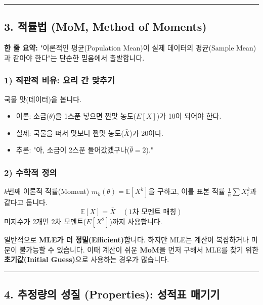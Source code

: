 \documentclass[11pt,a4paper]{book}
\theoremstyle{definition}
\begin{document}
\vspace{0.5cm}\hrule\vspace{0.5cm}

\subsection{3. 적률법 (MoM, Method of Moments)}

\begin{conceptbox}[title={개념 3: 평균을 평균에 맞춘다}]
\textbf{한 줄 요약:} "이론적인 평균(Population Mean)이 실제 데이터의 평균(Sample Mean)과 같아야 한다"는 단순한 믿음에서 출발합니다.
\end{conceptbox}

\subsubsection*{1) 직관적 비유: 요리 간 맞추기}
국물 맛(데이터)을 봅니다.
\begin{itemize}
    \item 이론: 소금($\theta$)을 1스푼 넣으면 짠맛 농도($E[X]$)가 10이 되어야 한다.
    \item 실제: 국물을 떠서 맛보니 짠맛 농도($\bar{X}$)가 20이다.
    \item 추론: "아, 소금이 2스푼 들어갔겠구나($\hat{\theta}=2$)."
\end{itemize}

\subsubsection*{2) 수학적 정의}
$k$번째 이론적 적률(Moment) $m_k(\theta) = \mathbb{E}[X^k]$을 구하고, 이를 표본 적률 $\frac{1}{n}\sum X_i^k$과 같다고 둡니다.
$$ \mathbb{E}[X] = \bar{X} \quad (\text{1차 모멘트 매칭}) $$
미지수가 2개면 2차 모멘트($E[X^2]$)까지 사용합니다.

\begin{warningbox}[title={MLE vs MoM: 누가 더 좋은가?}]
일반적으로 \textbf{MLE가 더 정밀(Efficient)}합니다. 하지만 MLE는 계산이 복잡하거나 미분이 불가능할 수 있습니다. 이때 계산이 쉬운 \textbf{MoM}을 먼저 구해서 MLE를 찾기 위한 \textbf{초기값(Initial Guess)}으로 사용하는 경우가 많습니다.
\end{warningbox}

\vspace{0.5cm}\hrule\vspace{0.5cm}

\subsection{4. 추정량의 성질 (Properties): 성적표 매기기}
\end{document}
